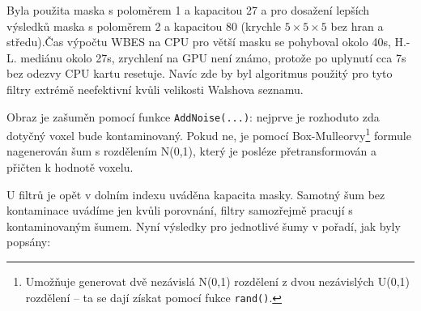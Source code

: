     Byla použita maska s poloměrem 1 a kapacitou 27 a pro dosažení lepších výsledků maska s poloměrem 2 a kapacitou 80 (krychle $5\times 5\times 5$ bez hran a středu).Čas výpočtu WBES na CPU pro větší masku se pohyboval okolo 40s, H.-L. mediánu okolo 27s, zrychlení na GPU není známo, protože po uplynutí cca 7s bez odezvy CPU kartu resetuje. Navíc zde by byl algoritmus použitý pro tyto filtry extrémě neefektivní kvůli velikosti Walshova seznamu.

    Obraz je zašuměn pomocí funkce {\tt AddNoise(...)}: nejprve je rozhoduto zda dotyčný voxel bude kontaminovaný. Pokud ne, je pomocí Box-Mulleorvy\footnote{Umožňuje generovat dvě nezávislá N(0,1) rozdělení z dvou nezávislých U(0,1) rozdělení -- ta se dají získat pomocí fukce {\tt rand()}.} formule nagenerován šum s rozdělením N(0,1), který je posléze přetransformován a přičten k hodnotě voxelu.

    U filtrů je opět v dolním indexu uváděna kapacita masky. Samotný šum bez kontaminace uvádíme jen kvůli porovnání, filtry samozřejmě pracují s kontaminovaným šumem. Nyní výsledky pro jednotlivé šumy v pořadí, jak byly popsány:

